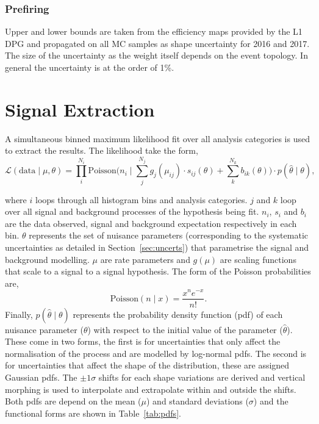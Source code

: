 \subsubsection{Prefiring}
Upper and lower bounds are taken from the efficiency maps provided by the L1 DPG and propagated on all MC samples as shape uncertainty for 2016 and 2017.
The size of the uncertainty as the weight itself depends on the event topology. In general the uncertainty is at the order of 1\%.

\newpage
\section{Signal Extraction}
\label{sec:sig_ext}

A simultaneous binned maximum likelihood fit over all analysis categories is used to extract the results.
The likelihood take the form,
\begin{equation}
\mathcal{L}(\text{data}\mid\mu,\theta) = \prod_{i}^{N_{i}} \text{Poisson} \Big(n_{i} \mid \sum_{j}^{N_{j}} g_{j}(\mu_{ij}) \cdot s_{ij}(\theta) + \sum_{k}^{N_{k}} b_{ik}(\theta)\Big) \cdot p(\hat{\theta} \mid \theta),
\label{eqn:likelihood}
\end{equation}

where $i$ loops through all histogram bins and analysis categories.
$j$ and $k$ loop over all signal and background processes of the hypothesis being fit.
$n_i$, $s_i$ and $b_i$ are the data observed, signal and background expectation respectively in each bin.
$\theta$ represents the set of nuisance parameters (corresponding to the systematic uncertainties as detailed in Section~\ref{sec:uncerts}) that parametrise the signal and background modelling.
$\mu$ are rate parameters and $g(\mu)$ are scaling functions that scale to a signal to a signal hypothesis.
The form of the Poisson probabilities are,
\begin{equation}
\text{Poisson} (n \mid x) = \frac{x^{n}e^{-x}}{n!}.
\end{equation}
Finally, $p(\hat{\theta} \mid \theta)$ represents the probability density function (pdf) of each nuisance parameter ($\theta$) with respect to the initial value of the parameter ($\hat{\theta}$). \\

These come in two forms, the first is for uncertainties that only affect the normalisation of the process and are modelled by log-normal pdfs. 
The second is for uncertainties that affect the shape of the distribution, these are assigned Gaussian pdfs.
The $\pm1\sigma$ shifts for each shape variations are derived and vertical morphing \cite{} is used to interpolate and extrapolate within and outside the shifts.
Both pdfs are depend on the mean ($\mu$) and standard deviations ($\sigma$) and the functional forms are shown in Table~\ref{tab:pdfs}. \\

